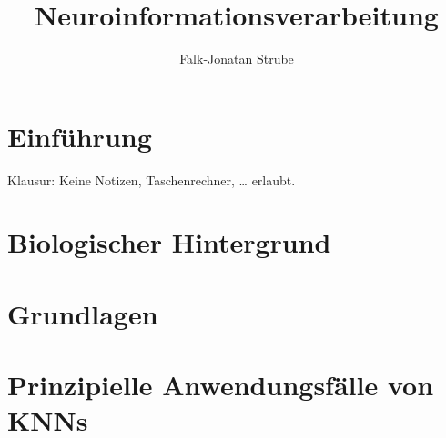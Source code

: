 \documentclass{scrreprt}
\title{Neuroinformationsverarbeitung}
\author{Falk-Jonatan Strube}
\begin{document}
\maketitle
\tableofcontents

\chapter*{Einführung}
Klausur: Keine Notizen, Taschenrechner, … erlaubt.

\chapter{Biologischer Hintergrund}


\chapter{Grundlagen}


\chapter{Prinzipielle Anwendungsfälle von KNNs}

\end{document}
